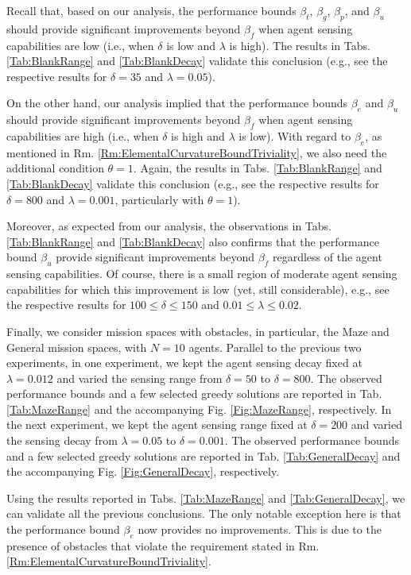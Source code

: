 \documentclass[letterpaper, 10 pt, conference]{ieeeconf}
\begin{document}
Recall that, based on our analysis, the performance bounds $\beta_t$, $\beta_g$, $\beta_p$, and $\beta_u$ should provide significant improvements beyond $\beta_f$ when agent sensing capabilities are low (i.e., when $\delta$ is low and $\lambda$ is high). The results in Tabs. \ref{Tab:BlankRange} and \ref{Tab:BlankDecay} validate this conclusion (e.g., see the respective results for $\delta = 35$ and $\lambda=0.05$). 

On the other hand, our analysis implied that the performance bounds $\beta_e$ and $\beta_u$  should provide significant improvements beyond $\beta_f$ when agent sensing capabilities are high (i.e., when $\delta$ is high and $\lambda$ is low). With regard to $\beta_e$, as mentioned in Rm. \ref{Rm:ElementalCurvatureBoundTriviality}, we also need the additional condition $\theta=1$. Again, the results in Tabs. \ref{Tab:BlankRange} and \ref{Tab:BlankDecay} validate this conclusion (e.g., see the respective results for $\delta=800$ and $\lambda=0.001$, particularly with $\theta = 1$).


Moreover, as expected from our analysis, the observations in Tabs. \ref{Tab:BlankRange} and \ref{Tab:BlankDecay} also confirms that the performance bound $\beta_u$ provide significant improvements beyond $\beta_f$ regardless of the agent sensing capabilities. Of course, there is a small region of moderate agent sensing capabilities for which this improvement is low (yet, still considerable), e.g., see the respective results for $100 \leq \delta \leq 150$ and $0.01 \leq \lambda \leq 0.02$.


Finally, we consider mission spaces with obstacles, in particular, the Maze and General mission spaces, with $N=10$ agents. Parallel to the previous two experiments, in one experiment, we kept the agent sensing decay fixed at $\lambda = 0.012$ and varied the sensing range from $\delta = 50$ to $\delta = 800$. The observed performance bounds and a few selected greedy solutions are reported in Tab. \ref{Tab:MazeRange} and the accompanying Fig. \ref{Fig:MazeRange}, respectively. In the next experiment, we kept the agent sensing range fixed at $\delta = 200$ and varied the sensing decay from $\lambda = 0.05$ to $\delta = 0.001$. The observed performance bounds and a few selected greedy solutions are reported in Tab. \ref{Tab:GeneralDecay} and the accompanying Fig. \ref{Fig:GeneralDecay}, respectively.

Using the results reported in Tabs. \ref{Tab:MazeRange} and \ref{Tab:GeneralDecay}, we can validate all the previous conclusions. The only notable exception here is that the performance bound $\beta_e$ now provides no improvements. This is due to the presence of obstacles that violate the requirement stated in Rm. \ref{Rm:ElementalCurvatureBoundTriviality}.    
\end{document}
